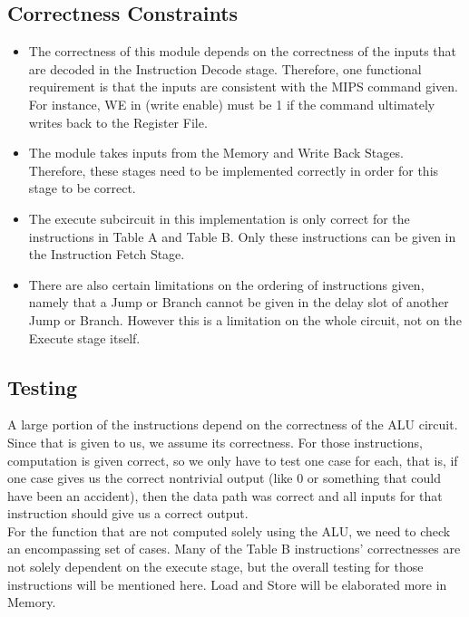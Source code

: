 \documentclass{article}
\begin{document}
\subsection{Correctness Constraints}
\begin{itemize}
\item The correctness of this module depends on the correctness of the inputs that are decoded in the Instruction Decode stage. Therefore, one functional requirement is that the inputs are consistent with the MIPS command given. For instance, WE in (write enable) must be 1 if the command ultimately writes back to the Register File. 
\item The module takes inputs from the Memory and Write Back Stages. Therefore, these stages need to be implemented correctly in order for this stage to be correct.
\item The execute subcircuit in this implementation is only correct for the instructions in Table A and Table B. Only these instructions can be given in the Instruction Fetch Stage.
\item There are also certain limitations on the ordering of instructions given, namely that a Jump or Branch cannot be given in the delay slot of another Jump or Branch. However this is a limitation on the whole circuit, not on the Execute stage itself.

\end{itemize}

\subsection{Testing}
A large portion of the instructions depend on the correctness of the ALU circuit. Since that is given to us, we assume its correctness. For those instructions, computation is given correct, so we only have to test one case for each, that is, if one case gives us the correct nontrivial output (like 0 or something that could have been an accident), then the data path was correct and all inputs for that instruction should give us a correct output.  \vspace{-.2cm} \\

\noindent For the function that are not computed solely using the ALU, we need to check an encompassing set of cases. Many of the Table B instructions' correctnesses are not solely dependent on the execute stage, but the overall testing for those instructions will be mentioned here. Load and Store will be elaborated more in Memory.  \vspace{-.2cm} \\
\end{document}
